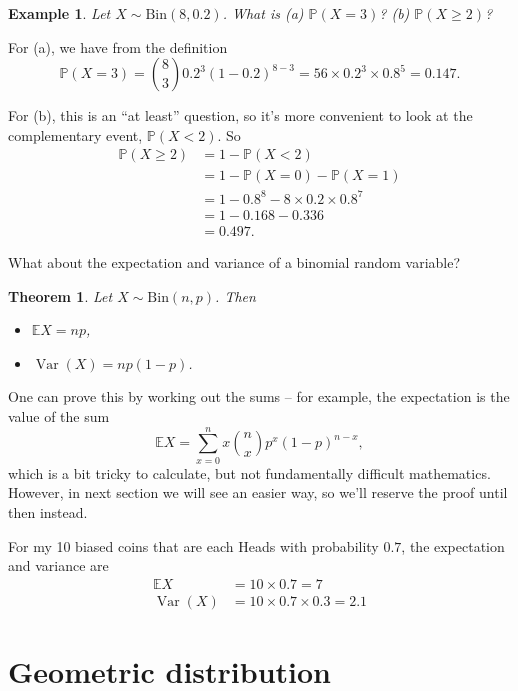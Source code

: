 \documentclass[
  a4paper,
]{book}
\providecommand{\tightlist}{%
  \setlength{\itemsep}{0pt}\setlength{\parskip}{0pt}}
\newtheorem{theorem}{Theorem}[chapter]
\theoremstyle{definition}
\theoremstyle{definition}
\newtheorem{example}{Example}[chapter]
\theoremstyle{definition}
\theoremstyle{definition}
\theoremstyle{remark}
\begin{document}
\begin{example}
\emph{Let \(X \sim \mathrm{Bin}(8, 0.2)\). What is (a) \(\mathbb P(X = 3)\)? (b) \(\mathbb P(X \geq 2)\)?}

For (a), we have from the definition
\[ \mathbb P(X = 3) = \binom83 0.2^3 (1 - 0.2)^{8-3} = 56\times 0.2^3\times0.8^5 = 0.147 .\]

For (b), this is an ``at least'' question, so it's more convenient to look at the complementary event, \(\mathbb P(X < 2)\). So
\begin{align*}
\mathbb P(X \geq 2) &= 1 - \mathbb P(X < 2) \\
  &= 1 - \mathbb P(X = 0) - \mathbb P(X = 1) \\
  &= 1 - 0.8^8 - 8\times 0.2 \times 0.8^7 \\
  &= 1 - 0.168 - 0.336 \\
  & = 0.497 .
\end{align*}
\end{example}

What about the expectation and variance of a binomial random variable?

\begin{theorem}

Let \(X \sim \text{Bin}(n, p)\). Then

\begin{itemize}
\tightlist
\item
  \(\mathbb EX = np\),
\item
  \(\operatorname{Var}(X) =np(1-p)\).
\end{itemize}

\end{theorem}

One can prove this by working out the sums -- for example, the expectation is the value of the sum
\[ \mathbb EX = \sum_{x=0}^n x \binom{n}{x} p^x (1-p)^{n-x} , \]
which is a bit tricky to calculate, but not fundamentally difficult mathematics.
However, in next section we will see an easier way, so we'll reserve the proof until then instead.

For my 10 biased coins that are each Heads with probability \(0.7\), the expectation and variance are
\begin{align*}
  \mathbb EX &= 10 \times 0.7 = 7 \\
  \operatorname{Var}(X) &= 10 \times 0.7 \times 0.3 = 2.1
\end{align*}

\hypertarget{geometric}{%
\section{Geometric distribution}\label{geometric}}
\end{document}

